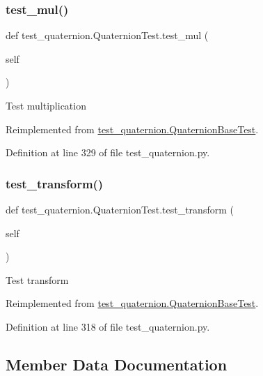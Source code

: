 \subsubsection{\texorpdfstring{test\_mul()}{test\_mul()}}
{\footnotesize\ttfamily def test\+\_\+quaternion.\+Quaternion\+Test.\+test\+\_\+mul (\begin{DoxyParamCaption}\item[{}]{self }\end{DoxyParamCaption})}

\begin{DoxyVerb}Test multiplication\end{DoxyVerb}
 

Reimplemented from \mbox{\hyperlink{classtest__quaternion_1_1QuaternionBaseTest_aa3c0b3602bde030cd8743e031dfa9b46}{test\+\_\+quaternion.\+Quaternion\+Base\+Test}}.



Definition at line 329 of file test\+\_\+quaternion.\+py.

\mbox{\label{classtest__quaternion_1_1QuaternionTest_a28f8557d25782bfe713fcc3772803f14}} 
\subsubsection{\texorpdfstring{test\_transform()}{test\_transform()}}
{\footnotesize\ttfamily def test\+\_\+quaternion.\+Quaternion\+Test.\+test\+\_\+transform (\begin{DoxyParamCaption}\item[{}]{self }\end{DoxyParamCaption})}

\begin{DoxyVerb}Test transform\end{DoxyVerb}
 

Reimplemented from \mbox{\hyperlink{classtest__quaternion_1_1QuaternionBaseTest_a161e9e423456902f536eb89e882c8f43}{test\+\_\+quaternion.\+Quaternion\+Base\+Test}}.



Definition at line 318 of file test\+\_\+quaternion.\+py.



\subsection{Member Data Documentation}
\mbox{\label{classtest__quaternion_1_1QuaternionTest_a04389965c7de447e79c50016691ee711}} 
